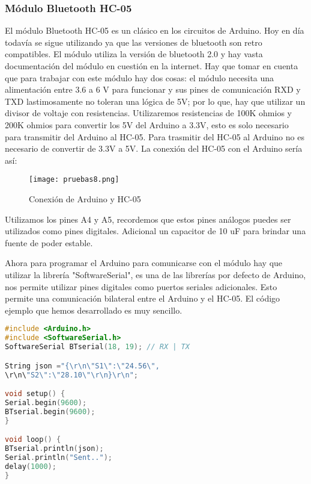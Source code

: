 \subsubsection{Módulo Bluetooth HC-05}
\par
El módulo Bluetooth HC-05 es un clásico en los circuitos de Arduino. Hoy en día todavía se sigue utilizando ya que las versiones de bluetooth son retro compatibles. El módulo utiliza la versión de bluetooth 2.0 y hay vasta documentación del módulo en cuestión en la internet. Hay que tomar en cuenta que para trabajar con este módulo hay dos cosas: el módulo necesita una alimentación entre 3.6 a 6 V para funcionar y sus pines de comunicación RXD y TXD lastimosamente no toleran una lógica de 5V; por lo que, hay que utilizar un divisor de voltaje con resistencias. Utilizaremos resistencias de 100K ohmios y 200K ohmios para convertir los 5V del Arduino a 3.3V, esto es solo necesario para transmitir del Arduino al HC-05. Para trasmitir del HC-05 al Arduino no es necesario de convertir de 3.3V a 5V. La conexión del HC-05 con el Arduino sería así:

\begin{figure}[H]
	\centering
	\texttt{[image: pruebas8.png]}
	\caption{Conexión de Arduino y HC-05}
\end{figure} 

\par \noindent
Utilizamos los pines A4 y A5, recordemos que estos pines análogos puedes ser utilizados como pines digitales. Adicional un capacitor de 10 uF para brindar una fuente de poder estable.

\par \noindent
Ahora para programar el Arduino para comunicarse con el módulo hay que utilizar la librería "SoftwareSerial", es una de las librerías por defecto de Arduino, nos permite utilizar pines digitales como puertos seriales adicionales. Esto permite una comunicación bilateral entre el Arduino y el HC-05. El código ejemplo que hemos desarrollado es muy sencillo.


\begin{lstlisting}[language=C++, caption={Codigo Ejemplo para módulo HC-05}, captionpos=b]
#include <Arduino.h>
#include <SoftwareSerial.h>
SoftwareSerial BTserial(18, 19); // RX | TX

String json ="{\r\n\"S1\":\"24.56\",
\r\n\"S2\":\"28.10\"\r\n}\r\n";

void setup() {
Serial.begin(9600);
BTserial.begin(9600);  
}

void loop() {
BTserial.println(json); 
Serial.println("Sent.."); 
delay(1000); 
}
\end{lstlisting} 

